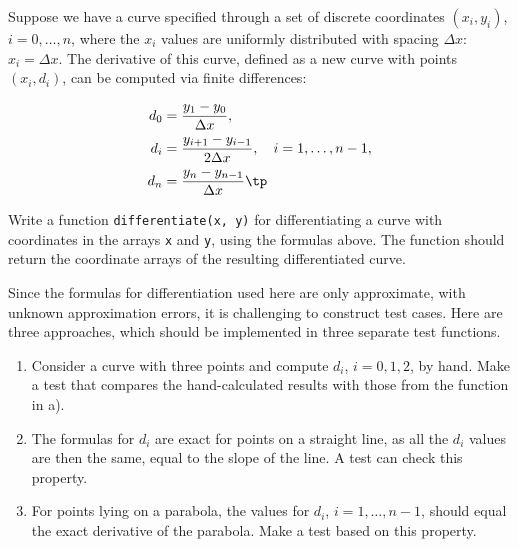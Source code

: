 \documentclass[graybox,sectrefs,envcountresetchap,open=right,final]{svmonodo}
\makeatletter
\newenvironment{doconceexercise}{}{}
\newcounter{doconceexercisecounter}%
\newcommand\listofexercises{
\chapter*{List of Exercises, Problems, and Projects
          \@mkboth{List of Exercises, Problems, and Projects}{List of Exercises, Problems, and Projects}}
\markboth{List of Exercises, Problems, and Projects}{List of Exercises, Problems, and Projects}
\@starttoc{loe}
}
\makeatother
\begin{document}
\begin{doconceexercise}

                
\label{softeng1:exer:derivative}

Suppose we have a curve specified through a set
of discrete coordinates $(x_i,y_i)$, $i=0,\ldots,n$, where the $x_i$
values are uniformly distributed with spacing $\Delta x$: $x_i=\Delta x$.
The derivative of this curve, defined as a new curve with points
$(x_i, d_i)$, can be computed via finite differences:

\begin{align}
d_0 &= \frac{y_1-y_0}{\Delta x},\\ 
d_i &= \frac{y_{i+1}-y_{i-1}}{2\Delta x},\quad i=1,\ldots,n-1,\\ 
d_n &= \frac{y_n-y_{n-1}}{\Delta x}\tp
\end{align}

Write a function
\texttt{differentiate(x, y)} for differentiating a curve
with coordinates in the arrays \texttt{x} and \texttt{y}, using the
formulas above. The function should return the coordinate arrays
of the resulting differentiated curve.


Since the formulas for differentiation used here are only approximate,
with unknown approximation errors, it is challenging to construct
test cases. Here are three approaches, which should be implemented
in three separate test functions.

\begin{enumerate}
\item Consider a curve with three points and compute $d_i$, $i=0,1,2$, by hand. Make a test that compares the hand-calculated results with those from the function in a).

\item The formulas for $d_i$ are exact for points on a straight line, as all the $d_i$ values are then the same, equal to the slope of the line. A test can check this property.

\item For points lying on a parabola, the values for $d_i$, $i=1,\ldots,n-1$, should equal the exact derivative of the parabola. Make a test based on this property.
\end{enumerate}


\end{doconceexercise}
\end{document}
